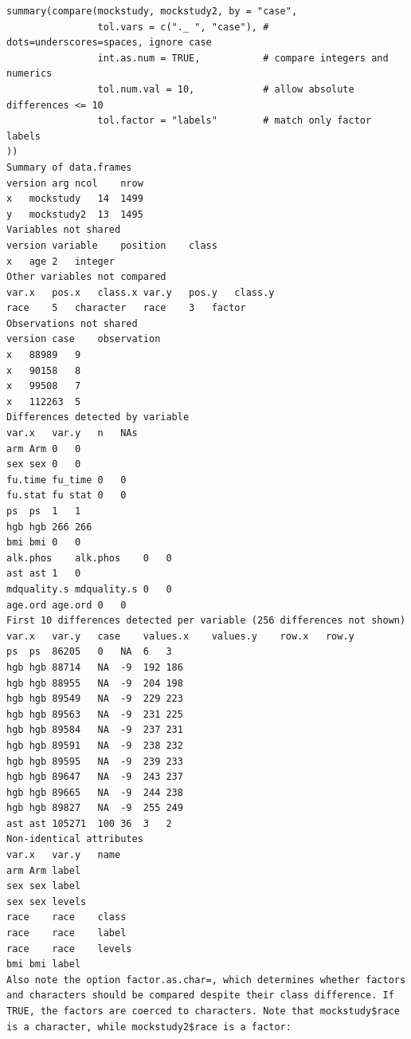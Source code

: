\documentclass[
]{book}
\begin{document}
\begin{verbatim}
summary(compare(mockstudy, mockstudy2, by = "case",
                tol.vars = c("._ ", "case"), # dots=underscores=spaces, ignore case
                int.as.num = TRUE,           # compare integers and numerics
                tol.num.val = 10,            # allow absolute differences <= 10
                tol.factor = "labels"        # match only factor labels
))
Summary of data.frames
version arg ncol    nrow
x   mockstudy   14  1499
y   mockstudy2  13  1495
Variables not shared
version variable    position    class
x   age 2   integer
Other variables not compared
var.x   pos.x   class.x var.y   pos.y   class.y
race    5   character   race    3   factor
Observations not shared
version case    observation
x   88989   9
x   90158   8
x   99508   7
x   112263  5
Differences detected by variable
var.x   var.y   n   NAs
arm Arm 0   0
sex sex 0   0
fu.time fu_time 0   0
fu.stat fu stat 0   0
ps  ps  1   1
hgb hgb 266 266
bmi bmi 0   0
alk.phos    alk.phos    0   0
ast ast 1   0
mdquality.s mdquality.s 0   0
age.ord age.ord 0   0
First 10 differences detected per variable (256 differences not shown)
var.x   var.y   case    values.x    values.y    row.x   row.y
ps  ps  86205   0   NA  6   3
hgb hgb 88714   NA  -9  192 186
hgb hgb 88955   NA  -9  204 198
hgb hgb 89549   NA  -9  229 223
hgb hgb 89563   NA  -9  231 225
hgb hgb 89584   NA  -9  237 231
hgb hgb 89591   NA  -9  238 232
hgb hgb 89595   NA  -9  239 233
hgb hgb 89647   NA  -9  243 237
hgb hgb 89665   NA  -9  244 238
hgb hgb 89827   NA  -9  255 249
ast ast 105271  100 36  3   2
Non-identical attributes
var.x   var.y   name
arm Arm label
sex sex label
sex sex levels
race    race    class
race    race    label
race    race    levels
bmi bmi label
Also note the option factor.as.char=, which determines whether factors and characters should be compared despite their class difference. If TRUE, the factors are coerced to characters. Note that mockstudy$race is a character, while mockstudy2$race is a factor:


\end{verbatim}
\end{document}

